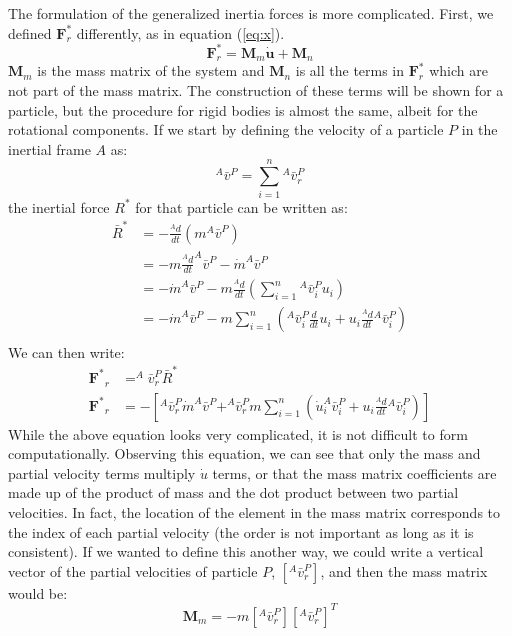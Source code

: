 \documentclass[twocolumn,10pt, final]{asme2e}
\begin{document}
The formulation of the generalized inertia forces is more complicated.
First, we defined $\mathbf{F}_r^*$ differently, as in equation (\ref{eq:x}).
\begin{equation}
\mathbf{F}_r^* = \mathbf{M}_m \mathbf{\dot{u}} + \mathbf{M}_n
\label{eq:x}
\end{equation}
$\mathbf{M}_m$ is the mass matrix of the system and $\mathbf{M}_n$ is all the
terms in $\mathbf{F}_r^*$ which are not part of the mass matrix. The
construction of these terms will be shown for a particle, but the procedure for
rigid bodies is almost the same, albeit for the rotational components.  If we
start by defining the velocity of a particle $P$ in the inertial frame $A$ as:
\begin{equation}
^{A}\bar{v}^{P} = \sum_{i=1}^{n} {} ^{A}\bar{v}_{r}^{P}
\end{equation}
the inertial force $R^*$ for that particle can be written as:
\begin{align}
\bar{R}^* &= -\frac{^{A} d}{dt}(m ^A\bar{v}^P) \\
&= -m \frac{^{A}d}{dt}^A\bar{v}^P - \dot{m} ^A\bar{v}^P \\
&= -\dot{m} ^A\bar{v}^P - m \frac{^{A}d}{dt}\left(\sum_{i=1}^{n}{} ^A
\bar{v}^P_i u_i \right) \\
&= -\dot{m} ^A\bar{v}^P - m \sum_{i=1}^{n} \left( ^A\bar{v}_i^P
\frac{d}{dt}u_i + u_i \frac{^{A}d}{dt} {}^A\bar{v}^P_i \right) \\
\end{align}
We can then write:
\begin{align}
\mathbf{F^*}_r &= ^A\bar{v}^P_r \bar{R}^{*} \\
\mathbf{F^*}_r &= - \left[
                   ^A\bar{v}^P_r \dot{m} ^A\bar{v}^P +
                   ^A\bar{v}^P_r m \sum_{i=1}^{n} \left(
                   \dot{u}_i ^A\bar{v}^P_i + u_i
                   \frac{^{A}d}{dt} {}^A\bar{v}^P_i
                   \right)
                   \right]
\end{align}
While the above equation looks very complicated, it is not difficult to form
computationally.
Observing this equation, we can see that only the mass and partial velocity
terms multiply $\dot{u}$ terms, or that the mass matrix coefficients are made
up of the product of mass and the dot product between two partial velocities.
In fact, the location of the element in the mass matrix corresponds to the
index of each partial velocity (the order is not important as long as it is
consistent).
If we wanted to define this another way, we could write a vertical vector of
the partial velocities of particle $P$, $[^A\bar{v}^P_r]$, and then the
mass matrix would be:
\begin{equation}
\mathbf{M}_m = -m \left[^A\bar{v}_r^P\right] \left[^A\bar{v}_r^P \right]^T
\end{equation}
\end{document}
